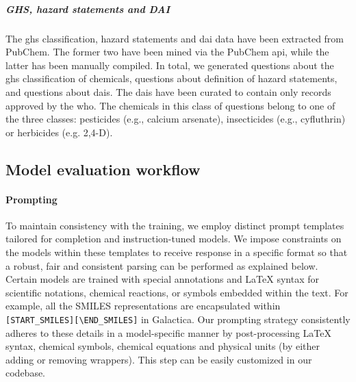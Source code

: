\documentclass[11pt, oneside]{article}
\begin{document}
\begin{refsection}
\subparagraph{GHS, hazard statements and DAI}
The \gls{ghs} classification, hazard statements and \gls{dai} data have been extracted from PubChem.\autocite{pubchem}
The former two have been mined via the PubChem \gls{api}, while the latter has been manually compiled. 
In total, we generated  questions about the \gls{ghs} classification of chemicals,  questions about definition of hazard statements, and  questions about \glspl{dai}.
The \glspl{dai} have been curated to contain only records approved by the \gls{who}.
The chemicals in this class of questions belong to one of the three classes: pesticides (e.g., calcium arsenate), insecticides (e.g., cyfluthrin) or herbicides (e.g. 2,4-D).


\subsection{Model evaluation workflow}

\paragraph{Prompting}

To maintain consistency with the training, we employ distinct prompt templates tailored for completion and instruction-tuned models. 
We impose constraints on the models within these templates to receive response in a specific format so that a robust, fair and consistent parsing can be performed as explained below.
Certain models are trained with special annotations and \LaTeX\xspace syntax for scientific notations, chemical reactions, or symbols embedded within the text. 
For example, all the SMILES representations are encapsulated within \texttt{[START\_SMILES][\textbackslash END\_SMILES]} in Galactica\autocite{taylor2022galactica}.
Our prompting strategy consistently adheres to  these details in a model-specific manner by post-processing \LaTeX\xspace syntax, chemical symbols, chemical equations and physical units (by either adding or removing wrappers).
This step can be easily customized in our codebase.




\end{refsection}
\end{document}
